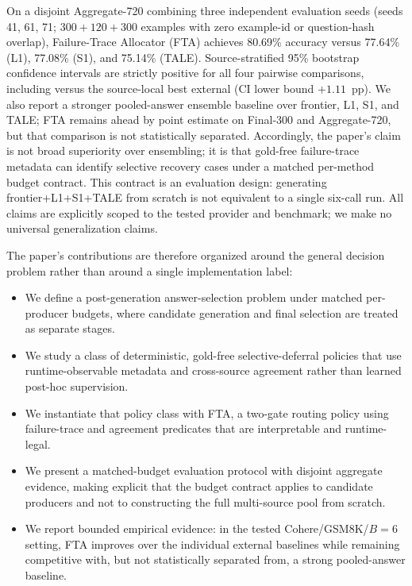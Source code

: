 On a disjoint Aggregate-720 combining three independent evaluation seeds (seeds 41,
61, 71; $300 + 120 + 300$ examples with zero example-id or question-hash overlap),
Failure-Trace Allocator (FTA) achieves 80.69\% accuracy versus 77.64\% (L1), 77.08\% (S1), and
75.14\% (TALE).
Source-stratified 95\% bootstrap confidence intervals are strictly positive for all
four pairwise comparisons, including versus the source-local best external
(CI lower bound $+1.11$~pp).
We also report a stronger pooled-answer ensemble baseline over frontier, L1, S1,
and TALE; FTA remains ahead by point estimate on Final-300 and Aggregate-720, but
that comparison is not statistically separated.
Accordingly, the paper's claim is not broad superiority over ensembling; it is that
gold-free failure-trace metadata can identify selective recovery cases under a
matched per-method budget contract.
This contract is an evaluation design: generating frontier+L1+S1+TALE from scratch
is not equivalent to a single six-call run.
All claims are explicitly scoped to the tested provider and benchmark; we make no
universal generalization claims.

The paper's contributions are therefore organized around the general decision
problem rather than around a single implementation label:
\begin{itemize}[leftmargin=1.5em]
  \item We define a post-generation answer-selection problem under matched per-producer budgets, where candidate generation and final selection are treated as separate stages.
  \item We study a class of deterministic, gold-free selective-deferral policies that use runtime-observable metadata and cross-source agreement rather than learned post-hoc supervision.
  \item We instantiate that policy class with FTA, a two-gate routing policy using failure-trace and agreement predicates that are interpretable and runtime-legal.
  \item We present a matched-budget evaluation protocol with disjoint aggregate evidence, making explicit that the budget contract applies to candidate producers and not to constructing the full multi-source pool from scratch.
  \item We report bounded empirical evidence: in the tested Cohere/GSM8K/$B=6$ setting, FTA improves over the individual external baselines while remaining competitive with, but not statistically separated from, a strong pooled-answer baseline.
\end{itemize}

